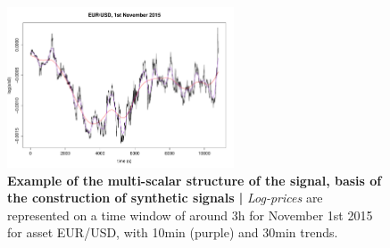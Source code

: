 

\begin{figure}%
\centering
\includegraphics[width=0.6\textwidth,height=0.25\textheight]{figures/asset/ex_filtering}
\caption{\textbf{Example of the multi-scalar structure of the signal, basis of the construction of synthetic signals | } \emph{Log-prices} are represented on a time window of around 3h for November 1st 2015 for asset EUR/USD, with 10min (purple) and 30min trends.}
\label{fig:example_signal}
\end{figure}

